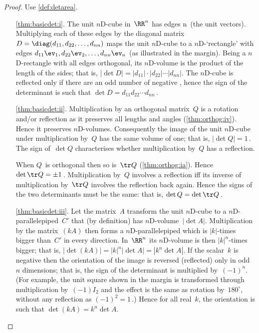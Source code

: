 \begin{proof} Use \autoref{def:detarea}.
\begin{itemize}
\item[\ref{thm:basicdet:i}.]
The unit $n$D-cube in~\(\RR^n\) has edges \hlist\ev n\ (the unit vectors).
Multiplying each of these edges by the diagonal matrix \(D=\diag(d_{11},d_{22},\ldots,d_{nn})\) maps the unit $n$D-cube to a $n$D-`rectangle' with edges \(d_{11}\ev_1,d_{22}\ev_2,\ldots,d_{nn}\ev_n\) (as illustrated in the margin).
Being a $n$D-rectangle with all edges orthogonal, its $n$D-volume is the product of the length of the sides; that is, \(|\det D|=|d_{11}|\cdot|d_{22}|\cdots |d_{nn}|\).
The $n$D-cube is reflected only if there are an odd number of negative , hence the sign of the determinant is such that \(\det D=d_{11}d_{22}\cdots d_{nn}\)\,.

\item[\ref{thm:basicdet:ii}.]
Multiplication by an orthogonal matrix~\(Q\) is a rotation and/or reflection as it preserves all lengths and angles (\autoref{thm:orthog:iv}).
Hence it preserves $n$D-volumes.
Consequently the image of the unit $n$D-cube under multiplication by~\(Q\) has the same volume of one; that is, \(|\det Q|=1\)\,.
The sign of~\(\det Q\) characterises whether multiplication by~\(Q\) has a reflection.

When \(Q\)~is orthogonal then so is~\(\tr Q\) (\autoref{thm:orthog:ia}).  Hence \(\det\tr Q=\pm1\)\,.
Multiplication by~\(Q\) involves a reflection iff its inverse of multiplication by~\(\tr Q\) involves the reflection back again.
Hence the signs of the two determinants must be the same: that is, \(\det Q=\det\tr Q\)\,.

\item[\ref{thm:basicdet:iii}.]
Let the matrix~\(A\) transform the unit $n$D-cube to a $n$D-parallelepiped~\(C'\) that  (by definition) has $n$D-volume~\(|\det A|\).
Multiplication by the matrix~\((kA)\) then forms a $n$D-parallelepiped which is \(|k|\)-times bigger than~\(C'\) in every direction.
In~\(\RR^n\) its $n$D-volume is then \(|k|^n\)-times bigger; that is,
\(|\det(kA)|=|k|^n|\det A|=|k^n\det A|\).
If the scalar~\(k\) is negative then the orientation of the image is reversed (reflected) only in odd~\(n\) dimensions; that is, the sign of the determinant is multiplied by~\((-1)^n\).
%
(For example, the unit square shown in the margin is transformed through multiplication by~\((-1)I_2\) and the effect is the same as rotation by~\(180^\circ\), without any reflection as \((-1)^2=1\)\,.)
Hence for all real~\(k\), the orientation is such that \(\det(kA)=k^n\det A\). 
\end{itemize}
\end{proof}




